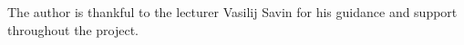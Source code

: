 \documentclass[]{VUMIFTemplateClass}
\begin{document}
The author is thankful to the lecturer Vasilij Savin for his guidance and
support throughout the project.












\end{document}
